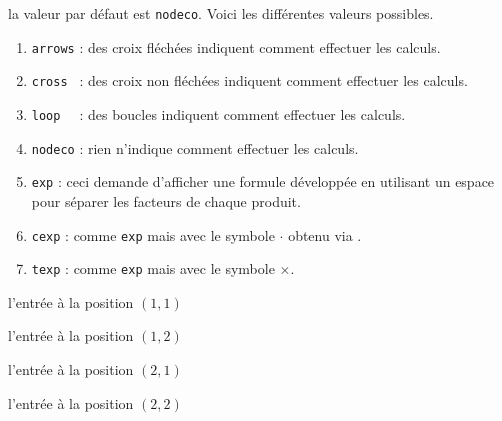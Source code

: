 \documentclass[12pt,a4paper]{article}
\begin{document}
\IDoption{} la valeur par défaut est \verb+nodeco+. Voici les différentes valeurs possibles.
\begin{enumerate}
    \item \verb+arrows+ : des croix fléchées indiquent comment effectuer les calculs.

    \item \verb+cross + : des croix non fléchées indiquent comment effectuer les calculs.

    \item \verb+loop  + : des boucles indiquent comment effectuer les calculs.

    \item \verb+nodeco+ : rien n'indique comment effectuer les calculs.

    \medskip

    \item \verb+exp+ : ceci demande d'afficher une formule développée en utilisant un espace pour séparer les facteurs de chaque produit.

    \item \verb+cexp+ : comme \verb+exp+ mais avec le symbole $\cdot$ obtenu via .

    \item \verb+texp+ : comme \verb+exp+ mais avec le symbole $\times$.
\end{enumerate}

 l'entrée à la position $(1, 1)$

 l'entrée à la position $(1, 2)$

\extraspace

 l'entrée à la position $(2, 1)$

 l'entrée à la position $(2, 2)$                   
\end{document}
